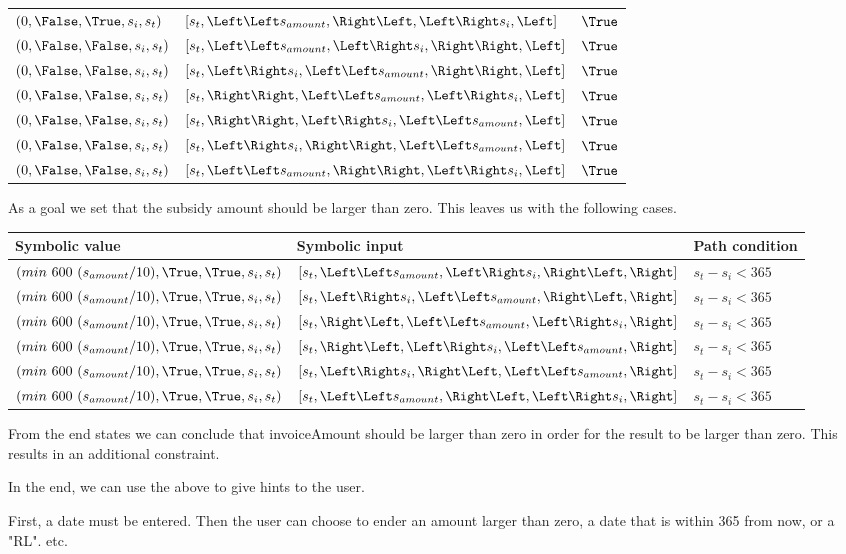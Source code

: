 \begin{tabular}{l|l|l}
  $(                        0, \False, \True, s_i, s_t)$ & $[s_t,\Left \Left s_{amount}, \Right \Left, \Left \Right s_i, \Left]$  & $\True$\\
  $(                        0, \False,\False, s_i, s_t)$ & $[s_t,\Left \Left s_{amount}, \Left \Right s_i, \Right\Right, \Left]$  & $\True$\\
  $(                        0, \False,\False, s_i, s_t)$ & $[s_t,\Left \Right s_i, \Left \Left s_{amount}, \Right\Right, \Left]$  & $\True$\\
  $(                        0, \False,\False, s_i, s_t)$ & $[s_t,\Right \Right,\Left \Left s_{amount}, \Left \Right s_i, \Left]$  & $\True$\\
  $(                        0, \False,\False, s_i, s_t)$ & $[s_t,\Right\Right, \Left \Right s_i, \Left \Left s_{amount}, \Left]$  & $\True$\\
  $(                        0, \False,\False, s_i, s_t)$ & $[s_t,\Left \Right s_i, \Right\Right, \Left \Left s_{amount}, \Left]$  & $\True$\\
  $(                        0, \False,\False, s_i, s_t)$ & $[s_t,\Left \Left s_{amount}, \Right\Right, \Left \Right s_i, \Left]$  & $\True$
\end{tabular}


As a goal we set that the subsidy amount should be larger than zero. This leaves us with the following cases.

\begin{tabular}{l|l|l}
  Symbolic value & Symbolic input & Path condition\\
  \hline
  $(min\ 600\ (s_{amount}/10),  \True, \True, s_i, s_t)$ & $[s_t,\Left \Left s_{amount}, \Left \Right s_i, \Right \Left, \Right]$ & $s_t-s_i<365$\\
  $(min\ 600\ (s_{amount}/10),  \True, \True, s_i, s_t)$ & $[s_t,\Left \Right s_i, \Left \Left s_{amount}, \Right \Left, \Right]$ & $s_t-s_i<365$\\
  $(min\ 600\ (s_{amount}/10),  \True, \True, s_i, s_t)$ & $[s_t,\Right \Left, \Left \Left s_{amount}, \Left \Right s_i, \Right]$ & $s_t-s_i<365$\\
  $(min\ 600\ (s_{amount}/10),  \True, \True, s_i, s_t)$ & $[s_t,\Right \Left, \Left \Right s_i, \Left \Left s_{amount}, \Right]$ & $s_t-s_i<365$\\
  $(min\ 600\ (s_{amount}/10),  \True, \True, s_i, s_t)$ & $[s_t,\Left \Right s_i, \Right \Left, \Left \Left s_{amount}, \Right]$ & $s_t-s_i<365$\\
  $(min\ 600\ (s_{amount}/10),  \True, \True, s_i, s_t)$ & $[s_t,\Left \Left s_{amount}, \Right \Left, \Left \Right s_i, \Right]$ & $s_t-s_i<365$
\end{tabular}

From the end states we can conclude that invoiceAmount should be larger than zero in order for the result to be larger than zero. This results in an additional constraint.

In the end, we can use the above to give hints to the user.

First, a date must be entered. Then the user can choose to ender an amount larger than zero, a date that is within 365 from now, or a "RL".
etc.
